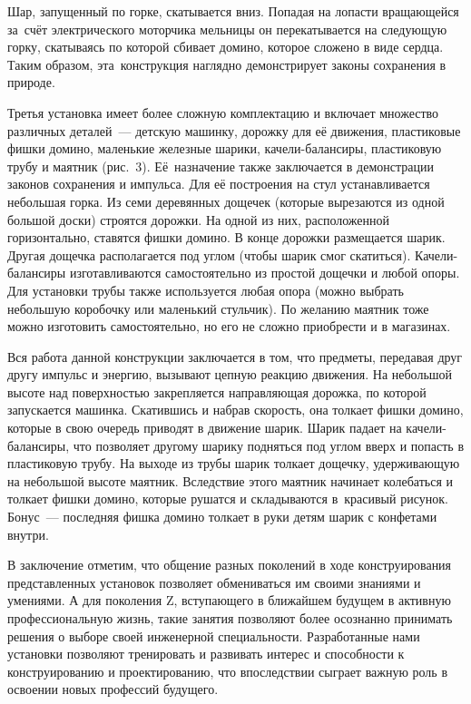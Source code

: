 

Шар, запущенный по горке, скатывается вниз. Попадая на лопасти вращающейся за~счёт электрического моторчика мельницы он перекатывается на следующую горку, скатываясь по которой сбивает домино, которое сложено в виде сердца. Таким образом, эта~конструкция наглядно демонстрирует законы сохранения в природе.\thispagestyle{empty}

Третья установка имеет более сложную комплектацию и включает множество различных деталей~--- детскую машинку, дорожку для её движения, пластиковые фишки домино, маленькие железные шарики, качели-балансиры, пластиковую трубу и маятник (рис.~3). Её~назначение также заключается в демонстрации законов сохранения и импульса. Для её построения на стул устанавливается небольшая горка. Из семи деревянных дощечек (которые вырезаются из одной большой доски) строятся дорожки. На одной из них, расположенной горизонтально, ставятся фишки домино. В конце дорожки размещается шарик. Другая дощечка располагается под углом (чтобы шарик смог скатиться). Качели-балансиры изготавливаются самостоятельно из простой дощечки и любой опоры. Для установки трубы также используется любая опора (можно выбрать небольшую коробочку или маленький стульчик). По желанию маятник тоже можно изготовить самостоятельно, но его не сложно приобрести и в магазинах.



Вся работа данной конструкции заключается в том, что предметы, передавая друг другу импульс и энергию, вызывают цепную реакцию движения. На небольшой высоте над поверхностью закрепляется направляющая дорожка, по которой запускается машинка. Скатившись и набрав скорость, она толкает фишки домино, которые в свою очередь приводят в движение шарик.  Шарик падает на качели-балансиры, что позволяет другому шарику подняться под углом вверх и попасть в пластиковую трубу. На выходе из трубы шарик толкает дощечку, удерживающую на небольшой высоте маятник. Вследствие этого маятник начинает колебаться и толкает фишки домино, которые рушатся и складываются в~красивый рисунок. Бонус~--- последняя фишка домино толкает в руки детям шарик с конфетами внутри.

В заключение отметим, что общение разных поколений в ходе конструирования представленных установок позволяет обмениваться им своими знаниями и умениями. А для поколения Z, вступающего в ближайшем будущем в активную профессиональную жизнь, такие занятия позволяют более осознанно принимать решения о выборе своей инженерной специальности. Разработанные нами установки позволяют тренировать и развивать интерес и способности к конструированию и проектированию, что впоследствии сыграет важную роль в освоении новых профессий будущего.

